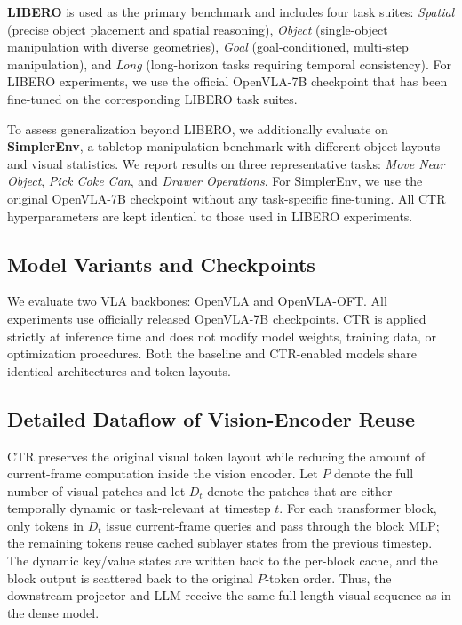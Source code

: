 \textbf{LIBERO} is used as the primary benchmark and includes four task suites:
\textit{Spatial} (precise object placement and spatial reasoning),
\textit{Object} (single-object manipulation with diverse geometries),
\textit{Goal} (goal-conditioned, multi-step manipulation),
and \textit{Long} (long-horizon tasks requiring temporal consistency).
For LIBERO experiments, we use the official OpenVLA-7B checkpoint that has been fine-tuned on the corresponding LIBERO task suites.

To assess generalization beyond LIBERO, we additionally evaluate on \textbf{SimplerEnv}, a tabletop manipulation benchmark with different object layouts and visual statistics.
We report results on three representative tasks: \textit{Move Near Object}, \textit{Pick Coke Can}, and \textit{Drawer Operations}.
For SimplerEnv, we use the original OpenVLA-7B checkpoint without any task-specific fine-tuning.
All CTR hyperparameters are kept identical to those used in LIBERO experiments.

\subsection{Model Variants and Checkpoints}
We evaluate two VLA backbones: OpenVLA and OpenVLA-OFT.
All experiments use officially released OpenVLA-7B checkpoints.
CTR is applied strictly at inference time and does not modify model weights, training data, or optimization procedures.
Both the baseline and CTR-enabled models share identical architectures and token layouts.

\subsection{Detailed Dataflow of Vision-Encoder Reuse}
CTR preserves the original visual token layout while reducing the amount of current-frame computation inside the vision encoder.
Let $P$ denote the full number of visual patches and let $D_t$ denote the patches that are either temporally dynamic or task-relevant at timestep $t$.
For each transformer block, only tokens in $D_t$ issue current-frame queries and pass through the block MLP; the remaining tokens reuse cached sublayer states from the previous timestep.
The dynamic key/value states are written back to the per-block cache, and the block output is scattered back to the original $P$-token order.
Thus, the downstream projector and LLM receive the same full-length visual sequence as in the dense model.

